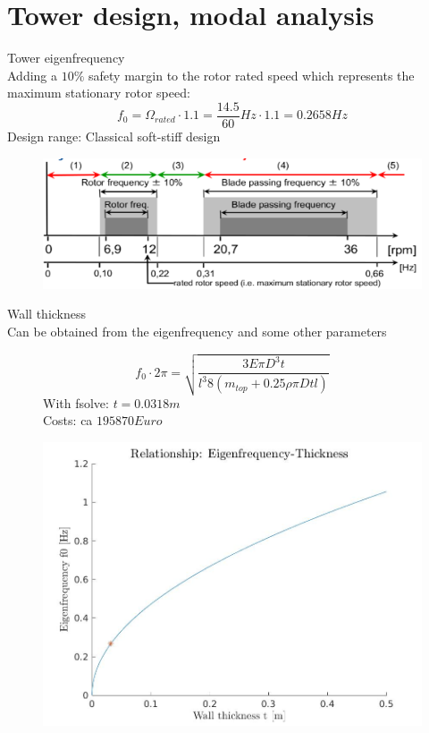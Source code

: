 \documentclass[12pt,t]{beamer}
\begin{document}
\section{Tower design, modal analysis}
\begin{frame}
\huge
Tower eigenfrequency\\[20pt]
\normalsize
Adding a $10 \%$ safety margin to the rotor rated speed which represents the maximum stationary rotor speed:
\begin{equation*}
	f_0 = \Omega_{rated} \cdot 1.1 = \frac{14.5}{60} Hz \cdot 1.1 = 0.2658 Hz
\end{equation*}
Design range: Classical soft-stiff design
\begin{figure}
\includegraphics[width=0.8\linewidth]{figures/designranges.png}
\end{figure}
\end{frame}

\begin{frame}
\huge
Wall thickness \\[20pt]
\small
Can be obtained from the eigenfrequency and some other parameters
\begin{figure}[htbp]
        \begin{minipage}{0.3\linewidth}
        \scriptsize
			\begin{equation*}
			f_0 \cdot 2 \pi  = \sqrt{\frac{3 E \pi D^3 t}{l^3 8 (m_{top} + 0.25\rho \pi D t l)}}
			\end{equation*}
			With fsolve:  $t=0.0318m$ \\
			Costs: ca $195870 Euro$
        \end{minipage}
		\qquad
        \begin{minipage}{0.5\linewidth}
			\includegraphics[width=\linewidth]{../CIP_4/figures/eigenfrequency.jpg}
        \end{minipage}
\end{figure}
\end{frame}
\end{document}
